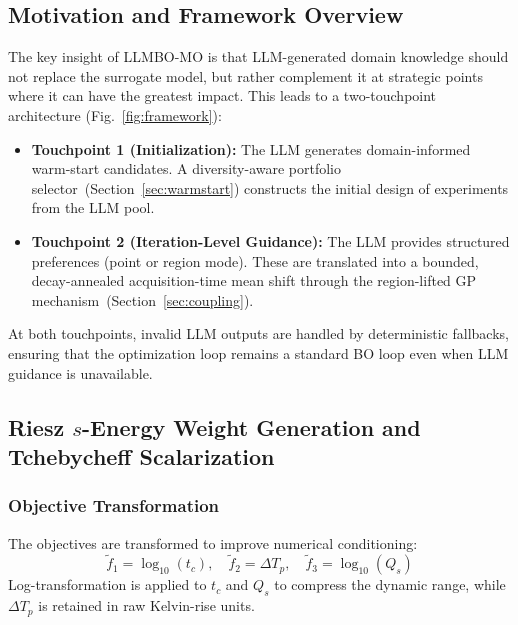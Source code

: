 \documentclass[journal]{IEEEtran}
\begin{document}
\subsection{Motivation and Framework Overview}

The key insight of LLMBO-MO is that LLM-generated domain knowledge should not replace the surrogate model, but rather complement it at strategic points where it can have the greatest impact. This leads to a two-touchpoint architecture (Fig.~\ref{fig:framework}):

\begin{itemize}
\item \textbf{Touchpoint 1 (Initialization):} The LLM generates domain-informed warm-start candidates. A diversity-aware portfolio selector~(Section~\ref{sec:warmstart}) constructs the initial design of experiments from the LLM pool.
\item \textbf{Touchpoint 2 (Iteration-Level Guidance):} The LLM provides structured preferences (point or region mode). These are translated into a bounded, decay-annealed acquisition-time mean shift through the region-lifted GP mechanism~(Section~\ref{sec:coupling}).
\end{itemize}



At both touchpoints, invalid LLM outputs are handled by deterministic fallbacks, ensuring that the optimization loop remains a standard BO loop even when LLM guidance is unavailable.

\subsection{Riesz $s$-Energy Weight Generation and Tchebycheff Scalarization}
\label{sec:scalarization}

\subsubsection{Objective Transformation}

The objectives are transformed to improve numerical conditioning:
\begin{equation}
\tilde{f}_1 = \log_{10}(t_c), \quad \tilde{f}_2 = \Delta T_p, \quad \tilde{f}_3 = \log_{10}(Q_s)
\label{eq:log_transform}
\end{equation}
Log-transformation is applied to $t_c$ and $Q_s$ to compress the dynamic range, while $\Delta T_p$ is retained in raw Kelvin-rise units.
\end{document}
